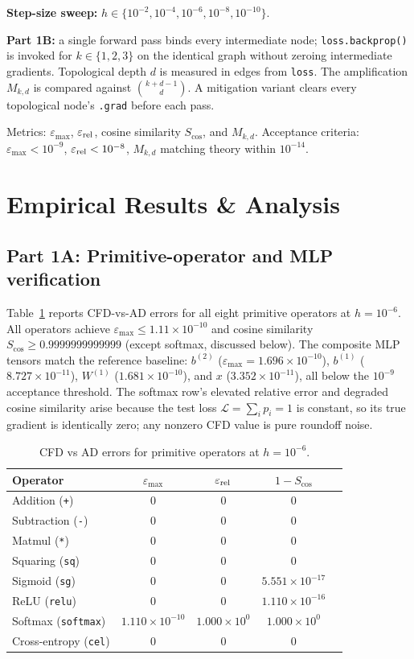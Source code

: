 \documentclass[11pt,a4paper]{article}
\begin{document}
\textbf{Step-size sweep:} $h \in \{10^{-2}, 10^{-4}, 10^{-6}, 10^{-8}, 10^{-10}\}$.

\textbf{Part 1B:} a single forward pass binds every intermediate node; \texttt{loss.backprop()} is invoked for $k\in\{1,2,3\}$ on the identical graph without zeroing intermediate gradients. Topological depth $d$ is measured in edges from \texttt{loss}. The amplification $M_{k,d}$ is compared against $\binom{k+d-1}{d}$. A mitigation variant clears every topological node's \texttt{.grad} before each pass.

Metrics: $\varepsilon_{\max}$, $\varepsilon_{\rm rel}$, cosine similarity $S_{\cos}$, and $M_{k,d}$. Acceptance criteria: $\varepsilon_{\max} < 10^{-9}$, $\varepsilon_{\rm rel} < 10^{-8}$, $M_{k,d}$ matching theory within $10^{-14}$.

\section{Empirical Results \& Analysis}

\subsection{Part 1A: Primitive-operator and MLP verification}
Table~\ref{tab:operr} reports CFD-vs-AD errors for all eight primitive operators at $h=10^{-6}$. All operators achieve $\varepsilon_{\max} \le 1.11\times10^{-10}$ and cosine similarity $S_{\cos}\ge 0.9999999999999$ (except softmax, discussed below). The composite MLP tensors match the reference baseline: $b^{(2)}$ ($\varepsilon_{\max}=1.696\times10^{-10}$), $b^{(1)}$ ($8.727\times10^{-11}$), $W^{(1)}$ ($1.681\times10^{-10}$), and $x$ ($3.352\times10^{-11}$), all below the $10^{-9}$ acceptance threshold. The softmax row's elevated relative error and degraded cosine similarity arise because the test loss $\mathcal{L}=\sum_i p_i=1$ is constant, so its true gradient is identically zero; any nonzero CFD value is pure roundoff noise.

\begin{table}[H]
\centering
\caption{CFD vs AD errors for primitive operators at $h=10^{-6}$.}
\label{tab:operr}
\begin{tabular}{lcccc}
\toprule
Operator & $\varepsilon_{\max}$ & $\varepsilon_{\rm rel}$ & $1-S_{\cos}$ \\
\midrule
Addition (\texttt{+}) & $0$ & $0$ & $0$ \\
Subtraction (\texttt{-}) & $0$ & $0$ & $0$ \\
Matmul (\texttt{*}) & $0$ & $0$ & $0$ \\
Squaring (\texttt{sq}) & $0$ & $0$ & $0$ \\
Sigmoid (\texttt{sg}) & $0$ & $0$ & $5.551\times10^{-17}$ \\
ReLU (\texttt{relu}) & $0$ & $0$ & $1.110\times10^{-16}$ \\
Softmax (\texttt{softmax}) & $1.110\times10^{-10}$ & $1.000\times10^{0}$ & $1.000\times10^{0}$ \\
Cross-entropy (\texttt{cel}) & $0$ & $0$ & $0$ \\
\bottomrule
\end{tabular}
\end{table}
\end{document}

